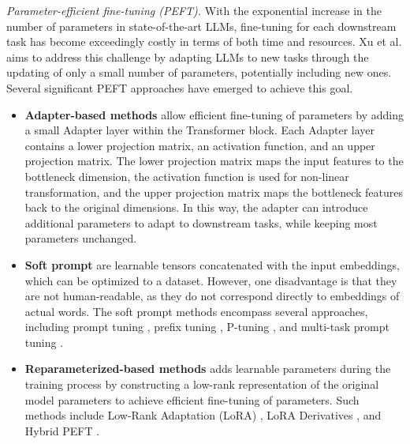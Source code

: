 \documentclass[sigconf]{acmart}
\begin{document}
\textit{Parameter-efficient fine-tuning (PEFT).} With the exponential increase in the number of parameters in state-of-the-art LLMs, fine-tuning for each downstream task has become exceedingly costly in terms of both time and resources. Xu et al. \cite{xu2023parameter} aims to address this challenge by adapting LLMs to new tasks through the updating of only a small number of parameters, potentially including new ones. Several significant PEFT approaches have emerged to achieve this goal.
\begin{itemize}
    \item \textbf {Adapter-based methods} \cite{kim2023efficient, cai2022fedadapter} allow efficient fine-tuning of parameters by adding a small Adapter layer within the Transformer block. Each Adapter layer contains a lower projection matrix, an activation function, and an upper projection matrix. The lower projection matrix maps the input features to the bottleneck dimension, the activation function is used for non-linear transformation, and the upper projection matrix maps the bottleneck features back to the original dimensions. In this way, the adapter can introduce additional parameters to adapt to downstream tasks, while keeping most parameters unchanged.
    \item \textbf{Soft prompt} are learnable tensors concatenated with the input embeddings, which can be optimized to a dataset. However, one disadvantage is that they are not human-readable, as they do not correspond directly to embeddings of actual words. The soft prompt methods encompass several approaches, including prompt tuning \cite{jia2022visual}, prefix tuning \cite{vos2022towards}, P-tuning \cite{liu2021p}, and multi-task prompt tuning \cite{asai2022attempt}.
    \item \textbf{Reparameterized-based methods} adds learnable parameters during the training process by constructing a low-rank representation of the original model parameters to achieve efficient fine-tuning of parameters. Such methods include Low-Rank Adaptation (LoRA) \cite{hu2021lora}, LoRA Derivatives \cite{yang2024moral}, and Hybrid PEFT \cite{runwal2024peft}.
\end{itemize}
\par
\end{document}
